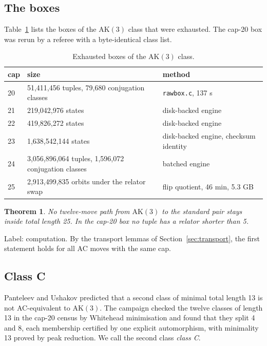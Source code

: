 \documentclass[11pt,a4paper]{article}
\newtheorem{theorem}{Theorem}[section]
\theoremstyle{definition}
\newcommand{\AK}{\mathrm{AK}}
\begin{document}
\subsection{The boxes}

Table~\ref{tab:box} lists the boxes of the $\AK(3)$ class that were exhausted. The cap-20 box was rerun by a referee with a byte-identical class list.

\begin{table}[h]
\centering
\small
\begin{tabular}{lll}
\toprule
cap & size & method \\
\midrule
20 & 51,411,456 tuples, 79,680 conjugation classes & \texttt{rawbox.c}, 137 s \\
21 & 219,042,976 states & disk-backed engine \\
22 & 419,826,272 states & disk-backed engine \\
23 & 1,638,542,144 states & disk-backed engine, checksum identity \\
24 & 3,056,896,064 tuples, 1,596,072 conjugation classes & batched engine \\
25 & 2,913,499,835 orbits under the relator swap & flip quotient, 46 min, 5.3 GB \\
\bottomrule
\end{tabular}
\caption{Exhausted boxes of the $\AK(3)$ class.}
\label{tab:box}
\end{table}

\begin{theorem}\label{thm:box25}
No twelve-move path from $\AK(3)$ to the standard pair stays inside total length 25. In the cap-20 box no tuple has a relator shorter than 5.
\end{theorem}

Label: computation. By the transport lemmas of Section~\ref{sec:transport}, the first statement holds for all AC moves with the same cap.

\subsection{Class C}

Panteleev and Ushakov \cite{PU19} predicted that a second class of minimal total length 13 is not AC-equivalent to $\AK(3)$. The campaign checked the twelve classes of length 13 in the cap-20 census by Whitehead minimisation and found that they split 4 and 8, each membership certified by one explicit automorphism, with minimality 13 proved by peak reduction. We call the second class \emph{class C}.
\end{document}
